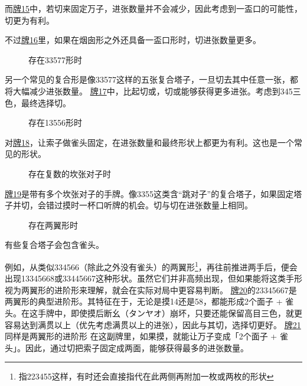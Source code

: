 而\hyperref[lec7:pai14-16]{牌15}中，若切来固定万子，进张数量并不会减少，因此考虑到一盃口的可能性，切更为有利。

不过\hyperref[lec7:pai14-16]{牌16}里，如果在烟囱形之外还具备一盃口形时，切进张数量更多。

\par\bigskip\noindent\ignorespaces
\begin{figure}[h]
    \caption{存在33577形时}
    \label{lec7:pai17}
\end{figure}
另一个常见的复合形是像33577这样的五张复合塔子，一旦切去其中任意一张，都将大幅减少进张数量。
\hyperref[lec7:pai17]{牌17}中，比起切或，切或能够获得更多进张。考虑到345三色，最终选择切。



\begin{figure}[h]
    \caption{存在13556形时}
    \label{lec7:pai18}
\end{figure}
对\hyperref[lec7:pai18]{牌18}，让索子做雀头固定，在进张数量和最终形状上都更为有利。这也是一个常见的形状。

\begin{figure}[h]
    \caption{存在复数的坎张对子时}
    \label{lec7:pai19}
\end{figure}\hyperref[lec7:pai19]{牌19}是带有多个坎张对子的手牌。像3355这类含“跳对子”的复合塔子，如果固定塔子并切，会错过摸时一杯口听牌的机会。切与切在进张数量上相同。

\begin{figure}[h]
    \caption{存在两翼形时}
    \label{lec7:pai20-21}
    \par\bigskip
\end{figure}

有些复合塔子会包含雀头。

例如，从类似334566（除此之外没有雀头）的两翼形\footnote{指223455这样，有时还会直接指代在此两侧再附加一枚或两枚的形状}，再往前推进两手后，便会出现13345668或33445667这种形状。虽然它们并非高频出现，但如果能将这类手形视为两翼形的进阶形来理解，就会在实际对局中更容易判断。
\hyperref[lec7:pai20-21]{牌20}的23345667是两翼形的典型进阶形。其特征在于，无论是摸14还是58，都能形成2个面子 + 雀头。在这手牌中，即使摸后断幺（タンヤオ）崩坏，只要还能保留高目三色，就更容易达到满贯以上（优先考虑满贯以上的进张），因此与其切，选择切更好。
\hyperref[lec7:pai20-21]{牌21}同样是两翼形的进阶形
在这副牌里，如果摸，就能让万子变成「2个面子 + 雀头」。因此，通过切把索子固定成两面，能够获得最多的进张数量。

